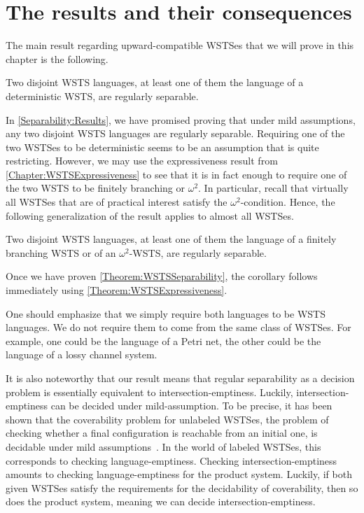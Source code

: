 \documentclass[../../diss.tex]{subfiles}
\begin{document}
\section{The results and their consequences}%
\label{Section:SeparabilityAndConsequences}%

The main result regarding upward-compatible WSTSes that we will prove in this chapter is the following.

\begin{theorem}%
\label{Theorem:WSTSSeparability}%
    Two disjoint WSTS languages, at least one of them the language of a deterministic WSTS, are regularly separable.
\end{theorem}

In \cref{Separability:Results}, we have promised proving that under mild assumptions, any two disjoint WSTS languages are regularly separable.
Requiring one of the two WSTSes to be deterministic seems to be an assumption that is quite restricting.
However, we may use the expressiveness result from \cref{Chapter:WSTSExpressiveness} to see that it is in fact enough to require one of the two WSTS to be finitely branching or $\omega^2$.
In particular, recall that virtually all WSTSes that are of practical interest satisfy the $\omega^2$-condition.
Hence, the following generalization of the result applies to almost all WSTSes.

\begin{corollary}
    Two disjoint WSTS languages, at least one of them the language of a finitely branching WSTS or of an $\omega^2$-WSTS, are regularly separable.
\end{corollary}

Once we have proven \cref{Theorem:WSTSSeparability}, the corollary follows immediately using \cref{Theorem:WSTSExpressiveness}.

One should emphasize that we simply require both languages to be WSTS languages.
We do not require them to come from the same class of WSTSes.
For example, one could be the language of a Petri net, the other could be the language of a lossy channel system.

It is also noteworthy that our result means that regular separability as a decision problem is essentially equivalent to intersection-emptiness.
Luckily, intersection-emptiness can be decided under mild-assumption.
To be precise, it has been shown that the coverability problem for unlabeled WSTSes, the problem of checking whether a final configuration is reachable from an initial one, is decidable under mild assumptions~\cite{AbdullaJ1993,GeeraertsRV06}.
In the world of labeled WSTSes, this corresponds to checking language-emptiness.
Checking intersection-emptiness amounts to checking language-emptiness for the product system.
Luckily, if both given WSTSes satisfy the requirements for the decidability of coverability, then so does the product system, meaning we can decide intersection-emptiness.
\end{document}
